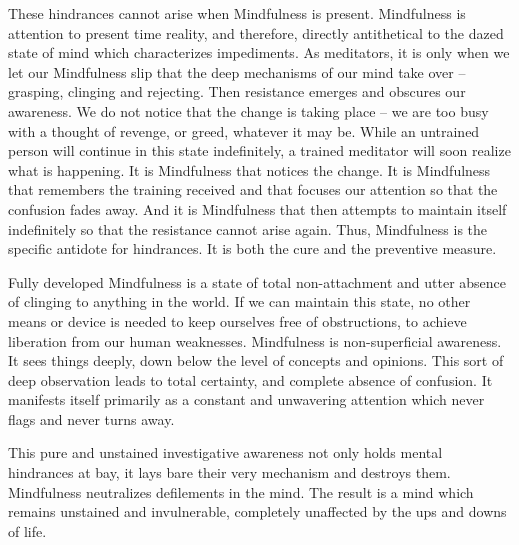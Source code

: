 These hindrances cannot arise when Mindfulness is present. Mindfulness is
attention to present time reality, and therefore, directly antithetical to the
dazed state of mind which characterizes impediments. As meditators, it is only
when we let our Mindfulness slip that the deep mechanisms of our mind take over
-- grasping, clinging and rejecting. Then resistance emerges and obscures our
awareness. We do not notice that the change is taking place -- we are too busy
with a thought of revenge, or greed, whatever it may be. While an untrained person will continue in this state indefinitely, a
trained meditator will soon realize what is happening.
It is Mindfulness that notices the change. It is Mindfulness that remembers the training received and that focuses our attention so
that the confusion fades away. And it is Mindfulness that then attempts to maintain itself indefinitely so that the resistance cannot
arise again. Thus, Mindfulness is the specific antidote for hindrances. It is both the cure and the preventive measure.

Fully developed Mindfulness is a state of total non-attachment and utter absence
of clinging to anything in the world. If we can maintain this state, no other
means or device is needed to keep ourselves free of obstructions, to achieve
liberation from our human weaknesses. Mindfulness is non-superficial awareness.
It sees things deeply, down below the level of concepts and opinions. This sort
of deep observation leads to total certainty, and complete absence of confusion.
It manifests itself primarily as a constant and unwavering attention which never
flags and never turns away.

This pure and unstained investigative awareness not only holds mental hindrances
at bay, it lays bare their very mechanism and destroys them. Mindfulness
neutralizes defilements in the mind. The result is a mind which remains
unstained and invulnerable, completely unaffected by the ups and downs of life.
